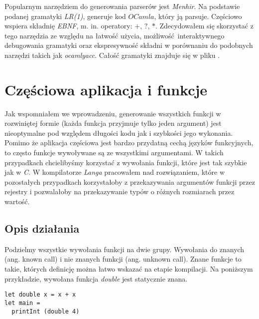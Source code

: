\documentclass[declaration,shortabstract]{iithesis}
\begin{document}
Popularnym narzędziem do generowania parserów jest \textit{Menhir}. Na 
\newline podstawie podanej gramatyki \textit{LR(1)}, generuje kod $OCamla$, 
który ją parsuje. Częściowo wspiera składnię \textit{EBNF}, m. in. operatory: $
+$, $?$, $\ast$. Zdecydowałem się skorzystać z tego narzędzia ze względu na 
łatwość użycia, możliwość interaktywnego debugowania gramatyki oraz 
ekspresywność składni w porównaniu do podobnych narzędzi takich jak \textit
{ocamlyacc}. Całość gramatyki znajduje się w pliku 
. 

\section{Częściowa aplikacja i funkcje}

Jak wspomniałem we wprowadzeniu, generowanie wszystkich funkcji w rozwiniętej 
formie (każda funkcja przyjmuje tylko jeden argument) jest nieoptymalne pod
względem długości kodu jak i szybkości jego wykonania. Pomimo że aplikacja 
częściowa jest bardzo przydatną cechą języków funkcyjnych, to często funkcje
wywoływane są ze wszystkimi argumentami. W takich przypadkach chcielibyśmy 
korzystać z wywołania funkcji, które jest tak szybkie jak w \textit{C}. 
W kompilatorze \textit{Langa} pracowałem nad rozwiązaniem, które w pozostałych 
przypadkach korzystałoby z przekazywania argumentów funkcji przez rejestry i 
pozwalałoby na przekazywanie typów o różnych rozmiarach przez wartość. 

\subsection{Opis działania}

Podzielmy wszystkie wywołania funkcji na dwie grupy. Wywołania do znanych 
(ang. known call) i nie znanych funkcji (ang. unknown call). Znane funkcje to 
takie, których definicję można łatwo wskazać na etapie kompilacji. 
Na poniższym przykładzie, wywołana funkcja \textit{double} jest statycznie znana.

\begin{lstlisting}[frame=single, caption=Wywołanie statycznie znanej funkcji.] 
let double x = x + x
let main = 
  printInt (double 4)
\end{lstlisting}
\end{document}
